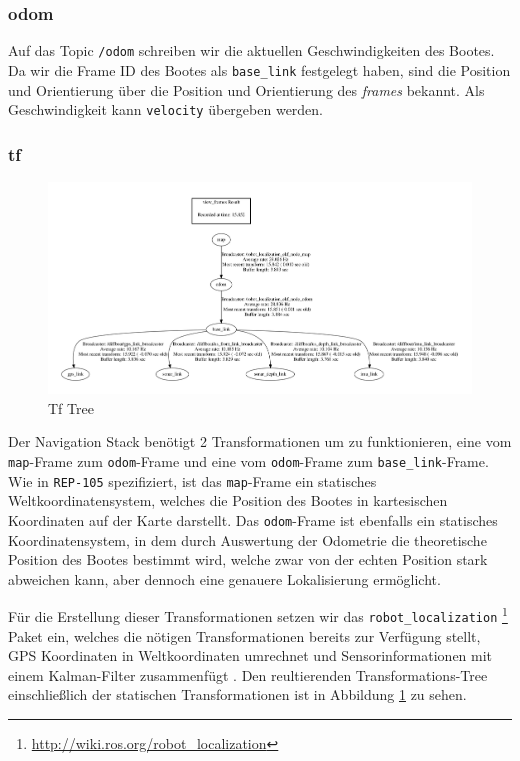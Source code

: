 \documentclass[11pt]{article}
\begin{document}
\subsubsection{odom}
Auf das Topic \texttt{/odom} schreiben wir die aktuellen Geschwindigkeiten des Bootes. Da wir die Frame ID des Bootes als \texttt{base\_link} festgelegt haben, sind die Position und Orientierung über die Position und Orientierung des \textit{frames} bekannt. Als Geschwindigkeit kann \texttt{velocity} übergeben werden.

\subsubsection{tf}

\begin{figure}
	\includegraphics[width=\linewidth]{frames.png}
	\caption{Tf Tree}
	\label{frames}
\end{figure}

Der Navigation Stack benötigt 2 Transformationen um zu funktionieren, eine vom \texttt{map}-Frame zum \texttt{odom}-Frame und eine vom \texttt{odom}-Frame zum \texttt{base\_link}-Frame. Wie in \texttt{REP-105} \cite{REP105} spezifiziert, ist das \texttt{map}-Frame ein statisches Weltkoordinatensystem, welches die Position des Bootes in kartesischen Koordinaten auf der Karte darstellt.  Das \texttt{odom}-Frame ist ebenfalls ein statisches Koordinatensystem, in dem durch Auswertung der Odometrie die theoretische Position des Bootes bestimmt wird, welche zwar von der echten Position stark abweichen kann, aber dennoch eine genauere Lokalisierung ermöglicht.

Für die Erstellung dieser Transformationen setzen wir das \texttt{robot\_localization} \footnote{\url{http://wiki.ros.org/robot_localization}} Paket ein, welches die nötigen Transformationen bereits zur Verfügung stellt, GPS Koordinaten in Weltkoordinaten umrechnet und Sensorinformationen mit einem Kalman-Filter zusammenfügt \cite{MooreStouchKeneralizedEkf2014}. Den reultierenden Transformations-Tree einschließlich der statischen Transformationen ist in Abbildung \ref{frames} zu sehen.\\
\end{document}
